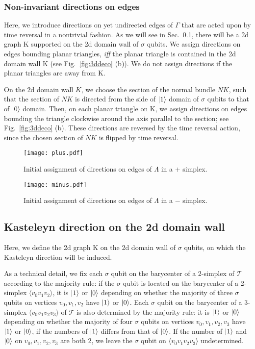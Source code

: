 \documentclass[12pt]{article}
\numberwithin{equation}{section}
\begin{document}
\subsubsection{Non-invariant directions on edges}
Here, we introduce directions on yet undirected edges of $\Gamma$ that are acted upon by time reversal in a nontrivial fashion. As we will see in Sec.~\ref{subsec:wall}, there will be a 2d graph $\mathrm{K}$ supported on the 2d domain wall of $\sigma$ qubits. 
We assign directions on edges bounding planar triangles, \textit{iff} the planar triangle is contained in the 2d domain wall $\mathrm{K}$ (see Fig.~\ref{fig:3ddeco} (b)). We do not assign directions if the planar triangles are away from $\mathrm{K}$.

On the 2d domain wall $K$, we choose the section of the normal bundle $NK$, such that the section of $NK$ is directed from the side of $\ket{1}$ domain of $\sigma$ qubits to that of $\ket{0}$ domain. Then, on each planar triangle on $\mathrm{K}$, we assign directions on edges bounding the triangle clockwise around the axis parallel to the section; see Fig.~\ref{fig:3ddeco} (b). 
These directions are reversed by the time reversal action, since the chosen section of $NK$ is flipped by time reversal.


\begin{figure}[htb]
\centering
\texttt{[image: plus.pdf]}
\caption{Initial assignment of directions on edges of $\Lambda$ in a $+$ simplex.}
\label{fig:plus}
\end{figure}

\begin{figure}[htb]
\centering
\texttt{[image: minus.pdf]}
\caption{Initial assignment of directions on edges of $\Lambda$ in a $-$ simplex.}
\label{fig:minus}
\end{figure}

\subsection{Kasteleyn direction on the 2d domain wall}
\label{subsec:wall}
Here, we define the 2d graph $\mathrm{K}$ on the 2d domain wall of $\sigma$ qubits, on which the Kasteleyn direction will be induced. 

As a technical detail, we fix each $\sigma$ qubit on the barycenter of a 2-simplex of $\mathcal{T}$ according to the majority rule: if the $\sigma$ qubit is located on the barycenter of a 2-simplex $\langle v_0v_1v_2\rangle$, it is $\ket{1}$ or $\ket{0}$ depending on whether the majority of three $\sigma$ qubits on vertices $v_0,v_1,v_2$ have $\ket{1}$ or $\ket{0}$. 
Each $\sigma$ qubit on the barycenter of a 3-simplex $\langle v_0v_1v_2v_3\rangle$ of $\mathcal{T}$ is also determined by the majority rule: it is $\ket{1}$ or $\ket{0}$ depending on whether the majority of four $\sigma$ qubits on vertices $v_0,v_1,v_2,v_3$ have $\ket{1}$ or $\ket{0}$, if the numbers of $\ket{1}$ differs from that of $\ket{0}$. If the number of $\ket{1}$ and $\ket{0}$ on $v_0,v_1,v_2,v_3$ are both 2, we leave the $\sigma$ qubit on $\langle v_0v_1v_2v_3\rangle$ undetermined.
\end{document}
